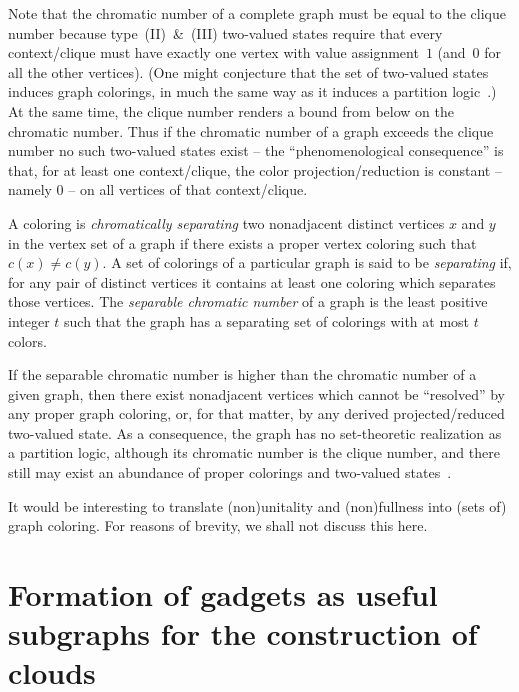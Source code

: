 \documentclass[%
  reprint,
  twocolumn,
 showpacs,
 showkeys,
 preprintnumbers,
 amsmath,amssymb,
 aps,
  prl,
  longbibliography,
 ]{revtex4-1}
\begin{document}
Note that the chromatic number of a complete graph must be equal to the clique number
because type~(II)~{\&}~(III) two-valued states require that every context/clique
must have exactly one vertex with value assignment~$1$ (and~$0$ for all the other vertices).
(One might conjecture that the set of two-valued states
induces graph colorings, in much the same way as it induces a partition logic~\cite{svozil-2001-eua}.)
At the same time, the clique number renders a bound from below on the chromatic number.
Thus if the chromatic number of a graph exceeds the clique number
no such two-valued states exist -- the ``phenomenological consequence'' is that, for at least one context/clique,
the color projection/reduction is constant -- namely $0$ -- on all vertices of that context/clique.



A coloring is {\em chromatically separating} two nonadjacent distinct vertices $x$ and $y$ in the vertex set of a graph
if there exists a proper vertex coloring such that $c(x) \neq c(y)$.
A set of colorings of a particular graph is said to be {\em separating}
if, for any pair of distinct vertices it contains at least one coloring which separates those vertices.
The {\em separable chromatic number} of a graph is the least positive integer $t$ such
that the graph has a separating set of colorings with at most $t$ colors.

If the separable chromatic number is higher than the chromatic number of a given graph,
then there exist nonadjacent vertices which cannot be ``resolved''
by any proper graph coloring, or, for that matter, by any derived
projected/reduced two-valued state.
As a consequence, the graph has no set-theoretic realization as a partition logic,
although its chromatic number is the clique number,
and there still may exist an abundance of proper colorings and two-valued states~\cite[$\Gamma_3$, p.~70]{kochen1}.

It would be interesting to translate (non)unitality and (non)fullness into (sets of) graph coloring.
For reasons of brevity, we shall not discuss this here.



\section{Formation of gadgets as useful subgraphs for the construction of clouds}
\end{document}
